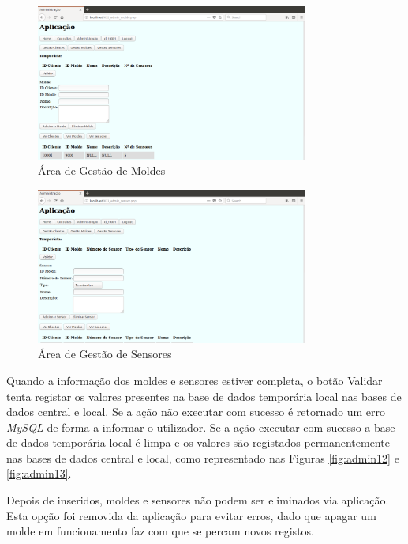 \documentclass[11pt,twoside,a4paper]{report}
\begin{document}
	\begin{figure}[H]
		\centering
			\includegraphics[width=0.8\textwidth]{administracao05} %
			\caption{Área de Gestão de Moldes}
			\label{fig:admin9}
	\end{figure}
	\begin{figure}[H]
		\centering
			\includegraphics[width=0.8\textwidth]{administracao06} %
			\caption{Área de Gestão de Sensores}
			\label{fig:admin10}
	\end{figure}
Quando a informação dos moldes e sensores estiver completa, o botão Validar tenta registar os valores presentes na base de dados temporária local nas bases de dados central e local. Se a ação não executar com sucesso é retornado um erro \textit{MySQL} de forma a informar o utilizador. Se a ação executar com sucesso a base de dados temporária local é limpa e os valores são registados permanentemente nas bases de dados central e local, como representado nas Figuras \ref{fig:admin12} e \ref{fig:admin13}.\par
Depois de inseridos, moldes e sensores não podem ser eliminados via aplicação. Esta opção foi removida da aplicação para evitar erros, dado que apagar um molde em funcionamento faz com que se percam novos registos.
\end{document}
